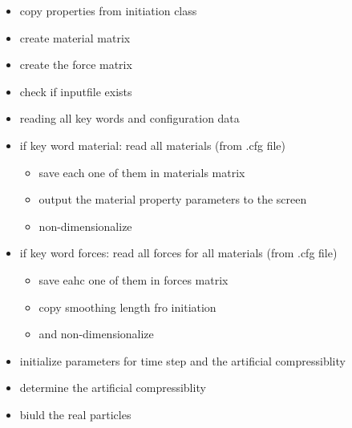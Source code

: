 \begin{itemize}
\item copy properties from initiation class

\item create material matrix

\item create the force matrix

\item check if inputfile exists

\item reading all key words and configuration data

\item if key word material: read all materials (from .cfg file)

\begin{itemize}
\item save each one of them in materials matrix

\item output the material property parameters to the screen

\item non-dimensionalize\end{itemize}


\item if key word forces: read all forces for all materials (from .cfg file)

\begin{itemize}
\item save eahc one of them in forces matrix

\item copy smoothing length fro initiation

\item and non-dimensionalize\end{itemize}


\item initialize parameters for time step and the artificial compressiblity

\item determine the artificial compressiblity

\item biuld the real particles \end{itemize}


